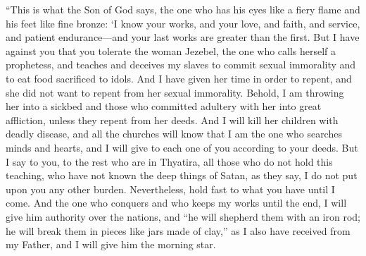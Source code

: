 \begin{biblechapter}
\verse “This is what the Son of God says, the one who has his eyes like a fiery flame and his feet like fine bronze:
\verse ‘I know your works, and your love, and faith, and service, and patient endurance—and your last works are greater than the first.
\verse But I have against you that you tolerate the woman Jezebel, the one who calls herself a prophetess, and teaches and deceives my slaves to commit sexual immorality and to eat food sacrificed to idols.
\verse And I have given her time in order to repent, and she did not want to repent from her sexual immorality.
\verse Behold, I am throwing her into a sickbed and those who committed adultery with her into great affliction, unless they repent from her deeds.
\verse And I will kill her children with deadly disease, and all the churches will know that I am the one who searches minds and hearts, and I will give to each one of you according to your deeds.
\verse But I say to you, to the rest who are in Thyatira, all those who do not hold this teaching, who have not known the deep things of Satan, as they say, I do not put upon you any other burden.
\verse Nevertheless, hold fast to what you have until I come.
\verse And the one who conquers and who keeps my works until the end, I will give him authority over the nations,
\verse and “he will shepherd them with an iron rod; he will break them in pieces like jars made of clay,”
\verse as I also have received from my Father, and I will give him the morning star.
\end{biblechapter}

